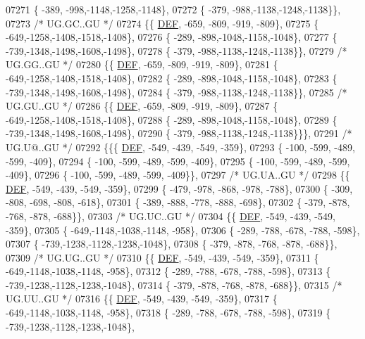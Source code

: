 \begin{DoxyCode}
07271 \{ -389, -998,-1148,-1258,-1148\},
07272 \{ -379, -988,-1138,-1248,-1138\}\},
07273 \textcolor{comment}{/* UG.GC..GU */}
07274 \{\{  \mbox{\hyperlink{1_88_84__epars_8h_a397419fc12b37ed479c8abb9d444d843}{DEF}}, -659, -809, -919, -809\},
07275 \{ -649,-1258,-1408,-1518,-1408\},
07276 \{ -289, -898,-1048,-1158,-1048\},
07277 \{ -739,-1348,-1498,-1608,-1498\},
07278 \{ -379, -988,-1138,-1248,-1138\}\},
07279 \textcolor{comment}{/* UG.GG..GU */}
07280 \{\{  \mbox{\hyperlink{1_88_84__epars_8h_a397419fc12b37ed479c8abb9d444d843}{DEF}}, -659, -809, -919, -809\},
07281 \{ -649,-1258,-1408,-1518,-1408\},
07282 \{ -289, -898,-1048,-1158,-1048\},
07283 \{ -739,-1348,-1498,-1608,-1498\},
07284 \{ -379, -988,-1138,-1248,-1138\}\},
07285 \textcolor{comment}{/* UG.GU..GU */}
07286 \{\{  \mbox{\hyperlink{1_88_84__epars_8h_a397419fc12b37ed479c8abb9d444d843}{DEF}}, -659, -809, -919, -809\},
07287 \{ -649,-1258,-1408,-1518,-1408\},
07288 \{ -289, -898,-1048,-1158,-1048\},
07289 \{ -739,-1348,-1498,-1608,-1498\},
07290 \{ -379, -988,-1138,-1248,-1138\}\}\},
07291 \textcolor{comment}{/* UG.U@..GU */}
07292 \{\{\{  \mbox{\hyperlink{1_88_84__epars_8h_a397419fc12b37ed479c8abb9d444d843}{DEF}}, -549, -439, -549, -359\},
07293 \{ -100, -599, -489, -599, -409\},
07294 \{ -100, -599, -489, -599, -409\},
07295 \{ -100, -599, -489, -599, -409\},
07296 \{ -100, -599, -489, -599, -409\}\},
07297 \textcolor{comment}{/* UG.UA..GU */}
07298 \{\{  \mbox{\hyperlink{1_88_84__epars_8h_a397419fc12b37ed479c8abb9d444d843}{DEF}}, -549, -439, -549, -359\},
07299 \{ -479, -978, -868, -978, -788\},
07300 \{ -309, -808, -698, -808, -618\},
07301 \{ -389, -888, -778, -888, -698\},
07302 \{ -379, -878, -768, -878, -688\}\},
07303 \textcolor{comment}{/* UG.UC..GU */}
07304 \{\{  \mbox{\hyperlink{1_88_84__epars_8h_a397419fc12b37ed479c8abb9d444d843}{DEF}}, -549, -439, -549, -359\},
07305 \{ -649,-1148,-1038,-1148, -958\},
07306 \{ -289, -788, -678, -788, -598\},
07307 \{ -739,-1238,-1128,-1238,-1048\},
07308 \{ -379, -878, -768, -878, -688\}\},
07309 \textcolor{comment}{/* UG.UG..GU */}
07310 \{\{  \mbox{\hyperlink{1_88_84__epars_8h_a397419fc12b37ed479c8abb9d444d843}{DEF}}, -549, -439, -549, -359\},
07311 \{ -649,-1148,-1038,-1148, -958\},
07312 \{ -289, -788, -678, -788, -598\},
07313 \{ -739,-1238,-1128,-1238,-1048\},
07314 \{ -379, -878, -768, -878, -688\}\},
07315 \textcolor{comment}{/* UG.UU..GU */}
07316 \{\{  \mbox{\hyperlink{1_88_84__epars_8h_a397419fc12b37ed479c8abb9d444d843}{DEF}}, -549, -439, -549, -359\},
07317 \{ -649,-1148,-1038,-1148, -958\},
07318 \{ -289, -788, -678, -788, -598\},
07319 \{ -739,-1238,-1128,-1238,-1048\},

\end{DoxyCode}
